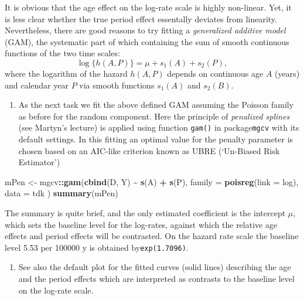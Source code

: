 \documentclass[
]{book}
\newenvironment{Shaded}{\begin{snugshade}}{\end{snugshade}}
\newcommand{\AttributeTok}[1]{\textcolor[rgb]{0.13,0.29,0.53}{#1}}
\newcommand{\FunctionTok}[1]{\textcolor[rgb]{0.13,0.29,0.53}{\textbf{#1}}}
\newcommand{\NormalTok}[1]{#1}
\newcommand{\OtherTok}[1]{\textcolor[rgb]{0.56,0.35,0.01}{#1}}
\newcommand{\SpecialCharTok}[1]{\textcolor[rgb]{0.81,0.36,0.00}{\textbf{#1}}}
\providecommand{\tightlist}{%
  \setlength{\itemsep}{0pt}\setlength{\parskip}{0pt}}
\begin{document}
It is obvious that the age effect on the log-rate scale is highly
non-linear. Yet, it is less clear whether the true period effect
essentally deviates from linearity. Nevertheless, there are good reasons
to try fitting a \emph{generalized additive model} (GAM), the systematic part
of which containing the sum of smooth continuous functions of the two
time scales: \[ \log \{h(A,P)\} = \mu + s_1(A) + s_2(P), \] where the
logarithm of the hazard \(h(A,P)\) depends on continuous age \(A\) (years)
and calendar year \(P\) via smooth functions \(s_1(A)\) and \(s_2(B)\).

\begin{enumerate}
\def\labelenumi{\arabic{enumi}.}
\tightlist
\item
  As the next task we fit the above defined GAM assuming the Poisson
  family as before for the random component. Here the principle of
  \emph{penalized splines} (see Martyn's lecture) is applied using function
  \texttt{gam()} in package\texttt{mgcv} with its default settings. In this fitting
  an optimal value for the penalty parameter is chosen based on an
  AIC-like criterion known as UBRE (`Un-Biased Risk Estimator')
\end{enumerate}

\begin{Shaded}
\begin{Highlighting}[]
\NormalTok{mPen }\OtherTok{\textless{}{-}}\NormalTok{ mgcv}\SpecialCharTok{::}\FunctionTok{gam}\NormalTok{(}\FunctionTok{cbind}\NormalTok{(D, Y) }\SpecialCharTok{\textasciitilde{}} \FunctionTok{s}\NormalTok{(A) }\SpecialCharTok{+} \FunctionTok{s}\NormalTok{(P),}
  \AttributeTok{family =} \FunctionTok{poisreg}\NormalTok{(}\AttributeTok{link =}\NormalTok{ log), }\AttributeTok{data =}\NormalTok{ tdk}
\NormalTok{)}
\FunctionTok{summary}\NormalTok{(mPen)}
\end{Highlighting}
\end{Shaded}

The summary is quite brief, and the only estimated coefficient is the
intercept \(\mu\), which sets the baseline level for the log-rates,
against which the relative age effects and period effects will be
contrasted. On the hazard rate scale the baseline level 5.53 per 100000
y is obtained by\texttt{exp(1.7096)}.

\begin{enumerate}
\def\labelenumi{\arabic{enumi}.}
\setcounter{enumi}{1}
\tightlist
\item
  See also the default plot for the fitted curves (solid lines)
  describing the age and the period effects which are interpreted as
  contrasts to the baseline level on the log-rate scale.
\end{enumerate}
\end{document}
